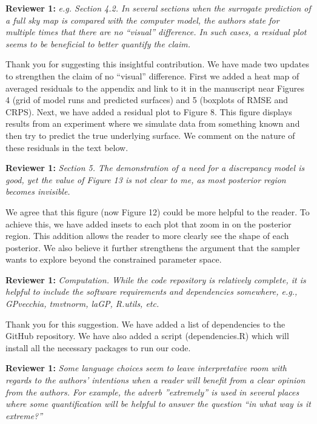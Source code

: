\documentclass[12pt]{article}
\begin{document}
\bigskip
\noindent
\textbf{Reviewer 1:} \textit{e.g. Section 4.2. In several sections when the
surrogate prediction of a full sky map is compared with the computer model,
the authors state for multiple times that there are no ``visual'' difference. In
such cases, a residual plot seems to be beneficial to better quantify the
claim.}

\bigskip
\noindent
Thank you for suggesting this insightful contribution. We have made two
updates to strengthen the claim of no ``visual'' difference. First we added a
heat map of averaged residuals to the appendix and link to it in the
manuscript near Figures 4 (grid of model runs and predicted surfaces) and 5
(boxplots of RMSE and CRPS). Next, we have added a residual plot to Figure 8.
This figure displays results from an experiment where we simulate data from
something known and then try to predict the true underlying surface. We
comment on the nature of these residuals in the text below.

\bigskip
\noindent
\textbf{Reviewer 1:} \textit{Section 5. The demonstration of a need for a
discrepancy model is good, yet the value of Figure 13 is not clear to me, as
most posterior region becomes invisible.}

\bigskip
\noindent
We agree that this figure (now Figure 12) could be more helpful to the reader.
To achieve this, we have added insets to each plot that zoom in on the
posterior region. This addition allows the reader to more clearly see the
shape of each posterior. We also believe it further strengthens the argument
that the sampler wants to explore beyond the constrained parameter space.

\bigskip
\noindent
\textbf{Reviewer 1:} \textit{Computation. While the code repository is
relatively complete, it is helpful to include the software requirements and
dependencies somewhere, e.g., GPvecchia, tmvtnorm, laGP, R.utils, etc.}

\bigskip
\noindent
Thank you for this suggestion. We have added a list of dependencies to the
GitHub repository. We have also added a script ({\sf dependencies.R}) which
will install all the necessary packages to run our code.

\bigskip
\noindent
\textbf{Reviewer 1:} \textit{Some language choices seem to leave
interpretative room with regards to the authors’ intentions when a reader
will benefit from a clear opinion from the authors. For example, the adverb
''extremely'' is used in several places where some quantification will be
helpful to answer the question ``in what way is it extreme?''}
\end{document}
